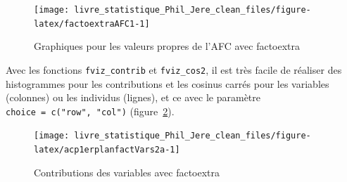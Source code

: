 \documentclass[
  11pt,
  french,
]{book}
\makeatletter
\newenvironment{Shaded}{\begin{snugshade}}{\end{snugshade}}
\newcommand{\DataTypeTok}[1]{\textcolor[rgb]{0.13,0.29,0.53}{#1}}
\newcommand{\DecValTok}[1]{\textcolor[rgb]{0.00,0.00,0.81}{#1}}
\newcommand{\KeywordTok}[1]{\textcolor[rgb]{0.13,0.29,0.53}{\textbf{#1}}}
\newcommand{\NormalTok}[1]{#1}
\newcommand{\OperatorTok}[1]{\textcolor[rgb]{0.81,0.36,0.00}{\textbf{#1}}}
\newcommand{\StringTok}[1]{\textcolor[rgb]{0.31,0.60,0.02}{#1}}
\newenvironment{kframe}{%
\medskip{}
\setlength{\fboxsep}{.8em}
 \def\at@end@of@kframe{}%
 \ifinner\ifhmode%
  \def\at@end@of@kframe{\end{minipage}}%
  \begin{minipage}{\columnwidth}%
 \fi\fi%
 \def\FrameCommand##1{\hskip\@totalleftmargin \hskip-\fboxsep
 \colorbox{shadecolor}{##1}\hskip-\fboxsep
     \hskip-\linewidth \hskip-\@totalleftmargin \hskip\columnwidth}%
 \MakeFramed {\advance\hsize-\width
   \@totalleftmargin\z@ \linewidth\hsize
   \@setminipage}}%
 {\par\unskip\endMakeFramed%
 \at@end@of@kframe}
\renewenvironment{Shaded}{\begin{kframe}}{\end{kframe}}
\makeatother
\begin{document}
\begin{figure}

{\centering \texttt{[image: livre\_statistique\_Phil\_Jere\_clean\_files/figure-latex/factoextraAFC1-1]} 

}

\caption{Graphiques pour les valeurs propres de l'AFC avec factoextra}\label{fig:factoextraAFC1}
\end{figure}

Avec les fonctions \texttt{fviz\_contrib} et \texttt{fviz\_cos2}, il est très facile de réaliser des histogrammes pour les contributions et les cosinus carrés pour les variables (colonnes) ou les individus (lignes), et ce avec le paramètre \texttt{choice\ =\ c("row",\ "col")} (figure~\ref{fig:acp1erplanfactVars2a}).

\begin{Shaded}
\end{Shaded}

\begin{figure}

{\centering \texttt{[image: livre\_statistique\_Phil\_Jere\_clean\_files/figure-latex/acp1erplanfactVars2a-1]} 

}

\caption{Contributions des variables avec factoextra}\label{fig:acp1erplanfactVars2a}
\end{figure}
\end{document}
